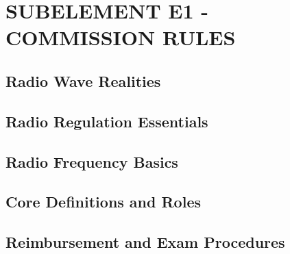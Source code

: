 \documentclass[12pt]{book}
\begin{document}
\tableofcontents
\newpage
\chapter{SUBELEMENT E1 - COMMISSION RULES}
\section{Radio Wave Realities}











\section{Radio Regulation Essentials}











\section{Radio Frequency Basics}












\section{Core Definitions and Roles}












\section{Reimbursement and Exam Procedures}











\end{document}
